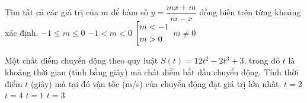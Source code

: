 	\begin{ex}%
		Tìm tất cả các giá trị của $m$ để hàm số $y=\dfrac{mx+m}{m-x}$ đồng biến trên từng khoảng xác định.
		\choice
		{$-1\le m\le0$}
		{$-1<m<0$}
		{\True $\left[\begin{aligned}&m<-1\\&m>0\end{aligned}\right.$}
		{$m\ne0$}
	\end{ex}
	\begin{ex}%
		Một chất điểm chuyển động theo quy luật $S(t)=12t^2-2t^3+3$, trong đó $t$ là khoảng thời gian (tính bằng giây) mà chất điểm bắt đầu chuyển động. Tính thời điểm $t$ (giây) mà tại đó vận tốc (m/s) của chuyển động đạt giá trị lớn nhất.
		\choice
		{\True $t=2$}
		{$t=4$}
		{$t=1$}
		{$t=3$}
	\end{ex}
	
